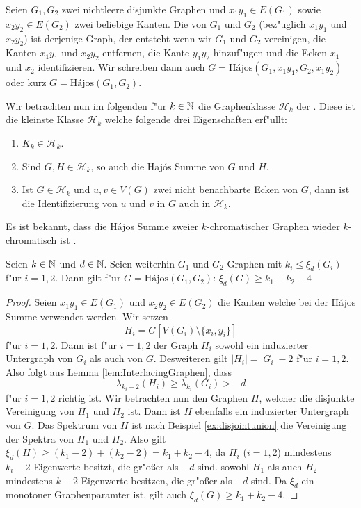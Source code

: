Seien $G_1, G_2$ zwei nichtleere disjunkte Graphen und $x_1y_1\in E(G_1)$ sowie $x_2y_2 \in E(G_2)$ zwei beliebige Kanten. Die  \cite{Hajos61} von $G_1$ und $G_2$ (bez"uglich $x_1y_1$ und $x_2y_2$) ist derjenige Graph, der entsteht wenn wir $G_1$ und $G_2$ vereinigen, die Kanten $x_1y_1$ und $x_2y_2$ entfernen, die Kante $y_1y_2$ hinzuf"ugen und  die Ecken $x_1$ und $x_2$ identifizieren. Wir schreiben dann auch $G= \text{H\'ajos}(G_1,x_1y_1,G_2,x_1y_2)$ oder
kurz $G= \text{H\'ajos}(G_1,G_2)$.

Wir betrachten nun im folgenden f"ur $k\in {\mathbb{N}}$ die Graphenklasse $\mathcal{H}_k$ der . Diese ist die kleinste Klasse $\mathcal{H}_k$ welche folgende drei Eigenschaften erf"ullt:
\begin{enumerate}
  \item $K_k\in \mathcal{H}_k$.
  \item Sind $G, H \in \mathcal{H}_k$, so auch die Haj\'os Summe von $G$ und $H$.
  \item Ist $G\in \mathcal{H}_k$ und $u,v\in V(G)$ zwei nicht benachbarte Ecken von $G$, dann ist die Identifizierung von $u$ und $v$ in $G$ auch in $\mathcal{H}_k$.
\end{enumerate}

Es ist bekannt, dass die H\'ajos Summe zweier $k$-chromatischer Graphen wieder $k$-chromatisch ist . 

\begin{theorem}
  Seien $k\in{\mathbb{N}}$ und $d\in{\mathbb{N}}$. Seien weiterhin $G_1$ und $G_2$ Graphen mit $k_i\leq \xi_{d}(G_i)$ f"ur $i=1,2$. Dann gilt f"ur $G= \text{H\'ajos}(G_1,G_2)$:
  $\xi_{d}(G) \geq k_1+k_2-4$
  \label{thm:hajoseigenwerte}
\end{theorem}

\begin{proof}
  Seien $x_1y_1\in E(G_1)$ und $x_2y_2\in E(G_2)$ die Kanten welche bei der H\'ajos Summe verwendet werden. Wir setzen $$H_i = G[V(G_i)\setminus\{x_i,y_i\}] $$ f"ur $i=1,2$. Dann ist f"ur $i=1,2$ der Graph $H_i$ sowohl ein induzierter Untergraph von $G_i$ als auch von $G$. 
  Desweiteren gilt $|H_i| = |G_i|-2$ f"ur $i=1,2$. Also folgt aus Lemma \ref{lem:InterlacingGraphen}, dass $$\lambda_{k_i-2}(H_i) \geq \lambda_{k_i}(G_i) > -d$$ f"ur $i=1,2$ richtig ist. Wir betrachten nun den Graphen $H$, welcher die disjunkte Vereinigung von $H_1$ und $H_2$ ist. Dann ist $H$ ebenfalls ein induzierter Untergraph von $G$. 
  Das Spektrum von $H$ ist nach Beispiel \ref{ex:disjointunion} die Vereinigung der Spektra von $H_1$ und $H_2$. Also gilt $\xi_{d}(H) \geq (k_1-2)+ (k_2-2) = k_1+k_2-4$, da $H_i$ ($i=1,2$) mindestens $k_i -2$ Eigenwerte besitzt, die gr"o{\ss}er als $-d$ sind.
  sowohl $H_1$ als auch $H_2$ mindestens $k-2$ Eigenwerte besitzen, die gr"o{\ss}er als $-d$ sind. 
  Da $\xi_d$ ein monotoner Graphenparamter ist, gilt auch $\xi_{d}(G) \geq k_1+k_2-4$.
\end{proof}

